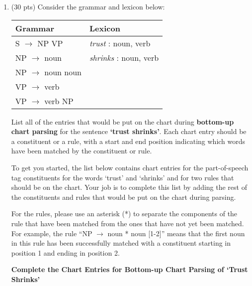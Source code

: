 \documentclass[11pt]{article}
\begin{document}
\begin{enumerate}
\newpage

\item (30 pts) Consider the grammar and lexicon below:

\begin{center}
\begin{tabular}{|ll|} \hline
\textbf{Grammar} & \textbf{Lexicon} \\  \hline
S $\rightarrow$ NP VP & {\it trust} : noun, verb \\
NP $\rightarrow$ noun & {\it shrinks} :  noun, verb \\
NP $\rightarrow$ noun noun  & ~ \\
VP $\rightarrow$ verb & ~ \\
VP $\rightarrow$ verb NP & ~ \\  \hline
\end{tabular}
\end{center}

\vspace*{.1in} List all of the entries that would be put on the chart during
{\bf bottom-up chart parsing} for the sentence {\bf `trust shrinks'}.
Each chart entry should be a constituent or a rule, with a start
and end position indicating which words have been matched by the
constituent or rule.

To get you started, the list below contains chart entries for the
part-of-speech tag constituents for the words `trust' and `shrinks'
and for two rules that should be on the chart. Your job is to complete
this list by adding the rest of the constituents and rules that would
be put on the chart during parsing.

For the rules, please use an asterisk (*) to separate the components
of the rule that have been matched from the ones that have not yet been
matched. For example, the rule ``NP $\rightarrow$ noun * noun [1-2]'' means that
 the first noun in this rule has been successfully matched with a
 constituent starting in position 1 and ending in position 2. \\

\begin{center}
{\bf Complete the Chart Entries for Bottom-up Chart Parsing of `Trust Shrinks'} 
\end{center}


\end{enumerate}
\end{document}
